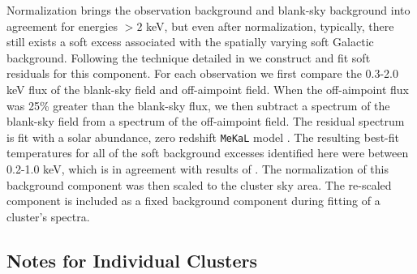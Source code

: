 \documentclass{emulateapj}
\begin{document}

{%


Normalization brings the observation background and blank-sky
background into agreement for energies $> 2$ keV, but even after
normalization, typically, there still exists a soft excess associated
with the spatially varying soft Galactic background. Following the
technique detailed in \cite{2005ApJ...628..655V} we construct and fit
soft residuals for this component. For each observation we first compare
the 0.3-2.0 keV flux of the blank-sky field and off-aimpoint field.
When the off-aimpoint flux
was 25\% greater than the blank-sky flux,  we then
subtract a spectrum of the blank-sky field from a spectrum of the off-aimpoint
field. The residual spectrum is fit with a solar abundance, zero
redshift {\tt MeKaL} model \citep{1985A&AS...62..197M, 1986A&AS...65..511M,
1992SRON, 1995ApJ...438L.115L}. The resulting
best-fit temperatures for all of the soft background excesses identified here 
were between 0.2-1.0 keV,  which is in agreement with results of
\cite{2005ApJ...628..655V}. The normalization of this background component was then
scaled to the cluster sky area. The re-scaled component is
included as a fixed background component during fitting
of a cluster's spectra.

\subsection{Notes for Individual Clusters} \label{sec:indnotes}

}
\end{document}
